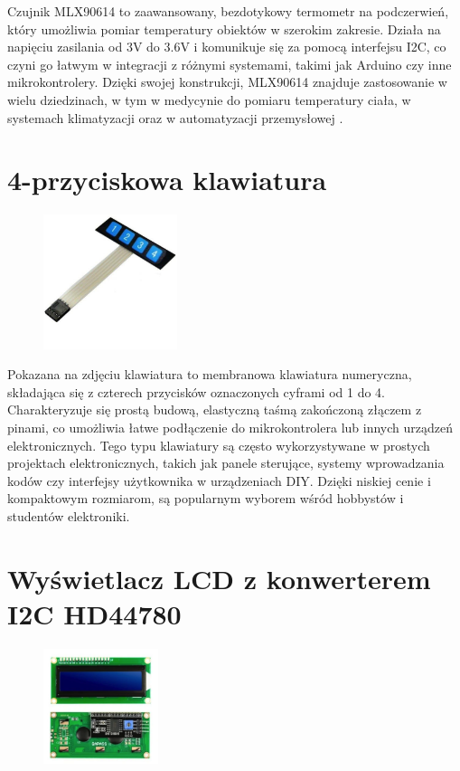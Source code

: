     Czujnik MLX90614 to zaawansowany, bezdotykowy termometr na podczerwień, który umożliwia pomiar temperatury obiektów w szerokim zakresie. Działa na napięciu zasilania od 3V do 3.6V i komunikuje się za pomocą interfejsu I2C, co czyni go łatwym w integracji z różnymi systemami, takimi jak Arduino czy inne mikrokontrolery. Dzięki swojej konstrukcji, MLX90614 znajduje zastosowanie w wielu dziedzinach, w tym w medycynie do pomiaru temperatury ciała, w systemach klimatyzacji oraz w automatyzacji przemysłowej \cite{5}.

    \section{4-przyciskowa klawiatura}

    \begin{figure}[h!]
        \centering
        \includegraphics[width=0.35\textwidth]{images/keyboard4pin.jpg}
        \label{fig:example}
    \end{figure}

    Pokazana na zdjęciu klawiatura to membranowa klawiatura numeryczna, składająca się z czterech przycisków oznaczonych cyframi od 1 do 4. Charakteryzuje się prostą budową, elastyczną taśmą zakończoną złączem z pinami, co umożliwia łatwe podłączenie do mikrokontrolera lub innych urządzeń elektronicznych. Tego typu klawiatury są często wykorzystywane w prostych projektach elektronicznych, takich jak panele sterujące, systemy wprowadzania kodów czy interfejsy użytkownika w urządzeniach DIY. Dzięki niskiej cenie i kompaktowym rozmiarom, są popularnym wyborem wśród hobbystów i studentów elektroniki.

    \section{Wyświetlacz LCD z konwerterem I2C HD44780}

    \begin{figure}[h!]
        \centering
        \includegraphics[width=0.3\textwidth]{images/lcd.png}
        \label{fig:example}
    \end{figure}
    
